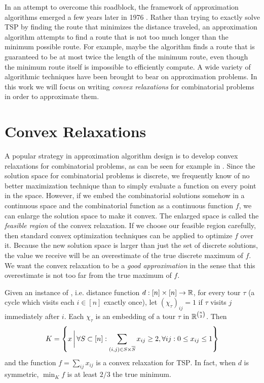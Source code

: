 In an attempt to overcome this roadblock, the framework of approximation algorithms emerged a few years later in 1976 \cite{SG76}. Rather than trying to exactly solve \textsc{TSP} by finding the route that minimizes the distance traveled, an approximation algorithm attempts to find a route that is not too much longer than the minimum possible route. For example, maybe the algorithm finds a route that is guaranteed to be at most twice the length of the minimum route, even though the minimum route itself is impossible to efficiently compute. A wide variety of algorithmic techniques have been brought to bear on approximation problems. In this work we will focus on writing \emph{convex relaxations} for combinatorial problems in order to approximate them.

\section{Convex Relaxations}
A popular strategy in approximation algorithm design is to develop convex relaxations for combinatorial problems, as can be seen for example in \cite{GW95,VY99,ARV09,Li13}.
Since the solution space for combinatorial problems is discrete, we frequently know of no better maximization technique than to simply evaluate a function on every point in the space. However, if we embed the combinatorial solutions somehow in a continuous space and the combinatorial function as a continuous function $f$, we can enlarge the solution space to make it convex. The enlarged space is called the \emph{feasible region} of the convex relaxation. If we choose our feasible region carefully, then standard convex optimization techniques can be applied to optimize $f$ over it. Because the new solution space is larger than just the set of discrete solutions, the value we receive will be an overestimate of the true discrete maximum of $f$. We want the convex relaxation to be a \emph{good approximation} in the sense that this overestimate is not too far from the true maximum of $f$.

\begin{example}
Given an instance of , i.e. distance function $d: [n] \times [n] \rightarrow \mathbb R$, for every tour $\tau$ (a cycle which visits each $i \in [n]$ exactly once), let $(\chi_\tau)_{ij} = 1$ if $\tau$ visits $j$ immediately after $i$. Each $\chi_\tau$ is an embedding of a tour $\tau$ in $\mathbb R^{\binom{n}{2}}$. Then
\[K = \left\{x \, \bigg{|} \, \forall S \subset [n]: \sum_{(i,j) \in S \times \overline{S}} x_{ij} \geq 2, \forall ij: 0 \leq x_{ij} \leq 1\right\}\]
and the function $f = \sum_{ij} x_{ij}$ is a convex relaxation for \textsc{TSP}. In fact, when $d$ is symmetric, $\min_K f$ is at least $2/3$ the true minimum.
\end{example}

